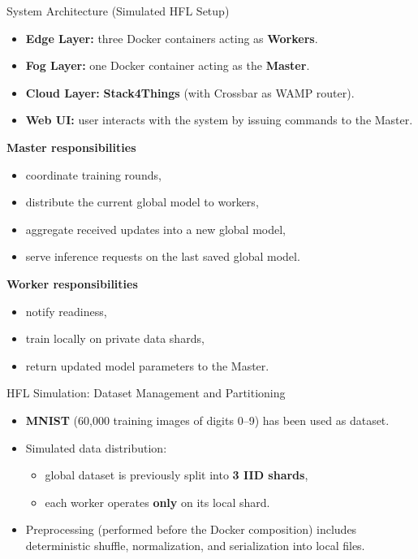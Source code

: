 \documentclass[aspectratio=169]{beamer}
\begin{document}
\begin{frame}{System Architecture (Simulated HFL Setup)}
\begin{itemize}
  \item \textbf{Edge Layer:} three Docker containers acting as \textbf{Workers}.
  \item \textbf{Fog Layer:} one Docker container acting as the \textbf{Master}.
  \item \textbf{Cloud Layer:} \textbf{Stack4Things} (with Crossbar as WAMP router).
  \item \textbf{Web UI:} user interacts with the system by issuing commands to the Master.
\end{itemize}

\vspace{0.4em}
\textbf{Master responsibilities}
\begin{itemize}
  \item coordinate training rounds,
  \item distribute the current global model to workers,
  \item aggregate received updates into a new global model,
  \item serve inference requests on the last saved global model.
\end{itemize}

\vspace{0.4em}
\textbf{Worker responsibilities}
\begin{itemize}
  \item notify readiness,
  \item train locally on private data shards,
  \item return updated model parameters to the Master.
\end{itemize}
\end{frame}

\begin{frame}{HFL Simulation: Dataset Management and Partitioning}
\begin{itemize}
  \item \textbf{MNIST} (60,000 training images of digits 0--9) has been used as dataset.
  \item Simulated data distribution:
  \begin{itemize}
    \item global dataset is previously split into \textbf{3 IID shards},
    \item each worker operates \textbf{only} on its local shard.
  \end{itemize}
  \item Preprocessing (performed before the Docker composition) includes deterministic shuffle, normalization, and serialization into local files.
\end{itemize}
\end{frame}
\end{document}
